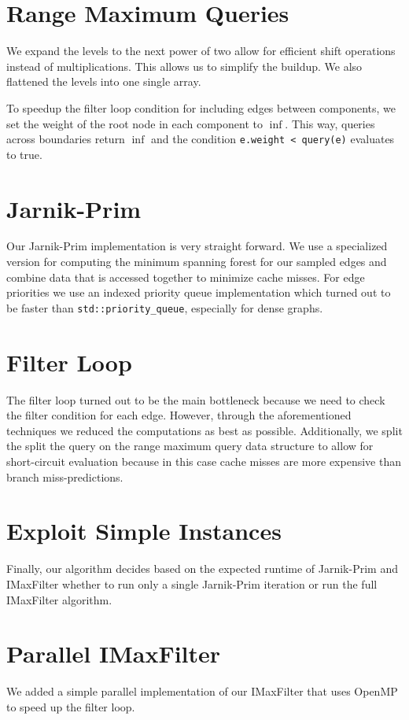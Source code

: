\documentclass{article}
\begin{document}
\section{Range Maximum Queries}
We expand the levels to the next power of two allow for efficient shift operations instead of multiplications.
This allows us to simplify the buildup. We also flattened the levels into one single array.

To speedup the filter loop condition for including edges between components, we set the weight of the root node in each component to $\inf$.
This way, queries across boundaries return $\inf$ and the condition \texttt{e.weight < query(e)} evaluates to true.

\section{Jarnik-Prim}
Our Jarnik-Prim implementation is very straight forward. We use a specialized version for computing the minimum spanning forest for our sampled edges and combine data that is accessed together to minimize cache misses. For edge priorities we use an indexed priority queue implementation which turned out to be faster than \texttt{std::priority\_queue}, especially for dense graphs.

\section{Filter Loop}
The filter loop turned out to be the main bottleneck because we need to check the filter condition for each edge. However, through the aforementioned techniques we reduced the computations as best as possible. Additionally, we split the split the query on the range maximum query data structure to allow for short-circuit evaluation because in this case cache misses are more expensive than branch miss-predictions.

\section{Exploit Simple Instances}
Finally, our algorithm decides based on the expected runtime of Jarnik-Prim and IMaxFilter whether to run only a single Jarnik-Prim iteration or run the full IMaxFilter algorithm.

\section{Parallel IMaxFilter}
We added a simple parallel implementation of our IMaxFilter that uses OpenMP to speed up the filter loop.
\end{document}
